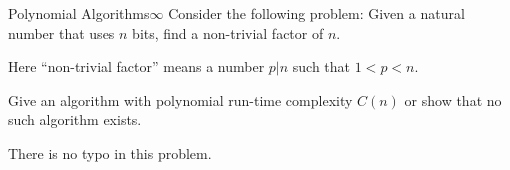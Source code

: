 \documentclass[a4paper]{article}
\begin{document}
\begin{problem}{Polynomial Algorithms}{$\infty$}
Consider the following problem: Given a natural number that uses $n$ bits, find a non-trivial factor of $n$.

Here ``non-trivial factor'' means a number $p|n$ such that $1<p<n$.

Give an algorithm with polynomial run-time complexity $C(n)$ or show that no such algorithm exists.

\begin{hint}
There is no typo in this problem.
\end{hint}
\end{problem}
\end{document}

